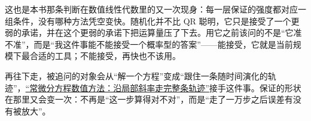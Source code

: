 这也是本书那条判断在数值线性代数里的又一次现身：每一层保证的强度都对应一组条件，没有哪种方法凭空变快。随机化并不比 QR 聪明，它只是接受了一个更弱的承诺，并在这个更弱的承诺下把运算量压了下去。用它之前该问的不是``它准不准''，而是``我这件事能不能接受一个概率型的答案''——能接受，它就是当前规模下最合适的工具；不能接受，再快也不该用。

再往下走，被追问的对象会从``解一个方程''变成``跟住一条随时间演化的轨迹''，\hyperref[ch:066]{``常微分方程数值方法：沿局部斜率走完整条轨迹''}接手这件事。保证的形状在那里又会变一次：不再是``这一步算得对不对''，而是``走了一万步之后误差有没有被放大''。
